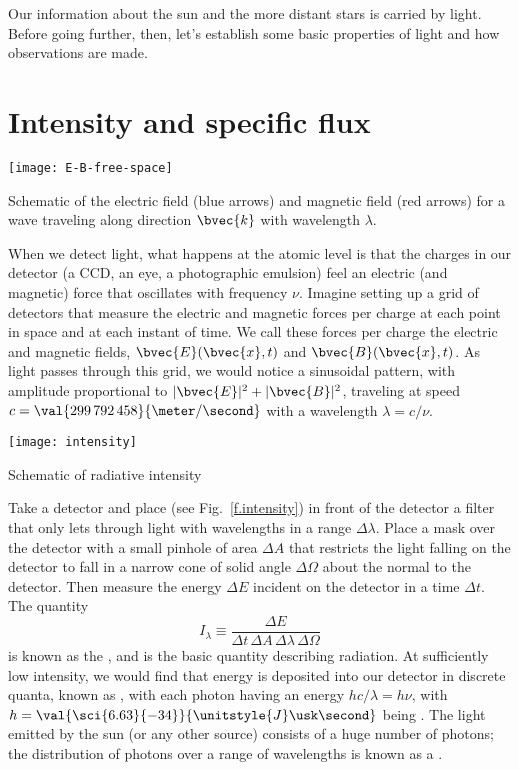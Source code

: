 Our information about the sun and the more distant stars is carried by light. Before going further, then, let's establish some basic properties of light and how observations are made.

\section{Intensity and specific flux}
\label{s.intensity-specific-flux}

\begin{marginfigure}
\texttt{[image: E-B-free-space]}
\caption[The electric force in a light wave]{Schematic of the electric field (blue arrows) and magnetic field (red arrows) for a wave traveling along direction $\bvec{k}$ with wavelength $\lambda$.}
\label{f.light-wave}
\end{marginfigure}
When we detect light, what happens at the atomic level is that the charges in our detector (a CCD, an eye, a photographic emulsion) feel an electric (and magnetic) force that oscillates with frequency $\nu$. Imagine setting up a grid of detectors that measure the electric and magnetic forces per charge at each point in space and at each instant of time. We call these forces per charge the electric and magnetic fields, $\bvec{E}(\bvec{x},t)$ and $\bvec{B}(\bvec{x},t)$. As light passes through this grid, we would notice a sinusoidal pattern, with amplitude proportional to $|\bvec{E}|^{2} + |\bvec{B}|^{2}$, traveling at speed $c = \val{299\,792\,458}{\meter/\second}$ with a wavelength $\lambda = c/\nu$.

\begin{marginfigure}
\texttt{[image: intensity]}
\caption{\label{f.intensity} Schematic of radiative intensity}
\end{marginfigure}
Take a detector and place (see Fig.~\ref{f.intensity}) in front of the detector a filter that only lets through light with wavelengths in a range $\Delta\lambda$. Place a mask over the detector with a small pinhole of area $\Delta A$ that restricts the light falling on the detector to fall in a narrow cone of solid angle $\Delta\Omega$ about the normal to the detector. Then measure the energy $\Delta E$ incident on the detector in a time $\Delta t$. The quantity
\begin{equation}\label{e.definition-intensity}
I_{\lambda} \equiv \frac{\Delta E}{\Delta t\,\Delta A\,\Delta\lambda\,\Delta\Omega}
\end{equation}
is known as the , and is the basic quantity describing radiation. At sufficiently low intensity, we would find that energy is deposited into our detector in discrete quanta, known as , with each photon having an energy $hc/\lambda = h\nu$, with $h = \val{\sci{6.63}{-34}}{\unitstyle{J}\usk\second}$ being . The light emitted by the sun (or any other source) consists of a huge number of photons; the distribution of photons over a range of wavelengths is known as a . 


